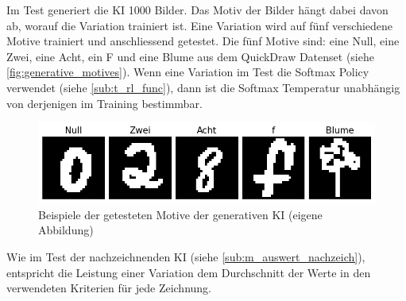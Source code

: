 Im Test generiert die KI 1000 Bilder. Das Motiv der Bilder hängt dabei davon ab,
worauf die Variation trainiert ist. Eine Variation wird auf fünf verschiedene
Motive trainiert und anschliessend getestet. Die fünf Motive sind: eine Null,
eine Zwei, eine Acht, ein F und eine Blume aus dem QuickDraw Datenset (siehe
\autoref{fig:generative_motives}). Wenn eine Variation im Test die Softmax
Policy verwendet (siehe \ref{sub:t_rl_func}), dann ist die Softmax
Temperatur unabhängig von derjenigen im Training bestimmbar.

\begin{figure}[!ht]
    \centering
    \includegraphics[width=\textwidth]{images/methode/generative-examples.png}
    \caption{Beispiele der getesteten Motive der generativen KI (eigene Abbildung)}\label{fig:generative_motives}
\end{figure}

Wie im Test der nachzeichnenden KI (siehe \ref{sub:m_auswert_nachzeich}),
entspricht die Leistung einer Variation dem Durchschnitt der Werte in den
verwendeten Kriterien für jede Zeichnung.
